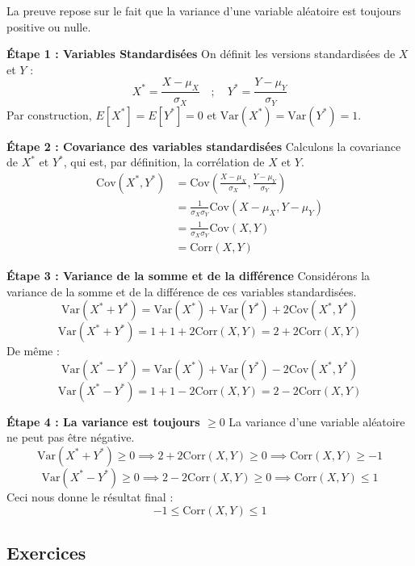 \begin{proofbox}
La preuve repose sur le fait que la variance d'une variable aléatoire est toujours positive ou nulle.

\textbf{Étape 1 : Variables Standardisées}
\newline
On définit les versions standardisées de $X$ et $Y$ :
$$ X^* = \frac{X - \mu_X}{\sigma_X} \quad ; \quad Y^* = \frac{Y - \mu_Y}{\sigma_Y} $$
Par construction, $E[X^*]=E[Y^*]=0$ et $\text{Var}(X^*) = \text{Var}(Y^*) = 1$.

\textbf{Étape 2 : Covariance des variables standardisées}
\newline
Calculons la covariance de $X^*$ et $Y^*$, qui est, par définition, la corrélation de $X$ et $Y$.
\begin{align*}
\text{Cov}(X^*, Y^*) &= \text{Cov}\left( \frac{X - \mu_X}{\sigma_X}, \frac{Y - \mu_Y}{\sigma_Y} \right) \\
&= \frac{1}{\sigma_X \sigma_Y} \text{Cov}(X - \mu_X, Y - \mu_Y) \\
&= \frac{1}{\sigma_X \sigma_Y} \text{Cov}(X, Y) \\
&= \text{Corr}(X,Y)
\end{align*}

\textbf{Étape 3 : Variance de la somme et de la différence}
\newline
Considérons la variance de la somme et de la différence de ces variables standardisées.
$$ \text{Var}(X^* + Y^*) = \text{Var}(X^*) + \text{Var}(Y^*) + 2\text{Cov}(X^*, Y^*) $$
$$ \text{Var}(X^* + Y^*) = 1 + 1 + 2\text{Corr}(X,Y) = 2 + 2\text{Corr}(X,Y) $$
De même :
$$ \text{Var}(X^* - Y^*) = \text{Var}(X^*) + \text{Var}(Y^*) - 2\text{Cov}(X^*, Y^*) $$
$$ \text{Var}(X^* - Y^*) = 1 + 1 - 2\text{Corr}(X,Y) = 2 - 2\text{Corr}(X,Y) $$

\textbf{Étape 4 : La variance est toujours $\ge 0$}
\newline
La variance d'une variable aléatoire ne peut pas être négative.
$$ \text{Var}(X^* + Y^*) \ge 0 \implies 2 + 2\text{Corr}(X,Y) \ge 0 \implies \text{Corr}(X,Y) \ge -1 $$
$$ \text{Var}(X^* - Y^*) \ge 0 \implies 2 - 2\text{Corr}(X,Y) \ge 0 \implies \text{Corr}(X,Y) \le 1 $$
Ceci nous donne le résultat final :
$$ -1 \le \text{Corr}(X,Y) \le 1 $$
\end{proofbox}

\subsection{Exercices}

